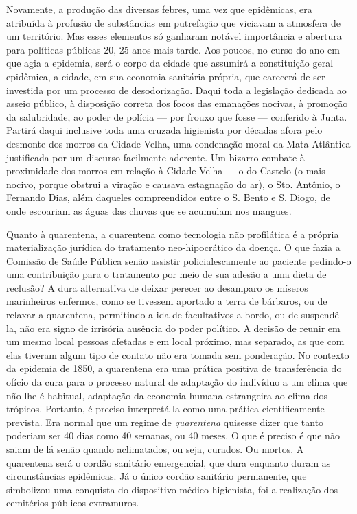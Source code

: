 Novamente, a produção das diversas febres, uma vez que epidêmicas, era
atribuída à profusão de substâncias em putrefação que viciavam a
atmosfera de um território. Mas esses elementos só ganharam notável
importância e abertura para políticas públicas 20, 25 anos mais tarde.
Aos poucos, no curso do ano em que agia a epidemia, será o corpo da
cidade que assumirá a constituição geral epidêmica, a cidade, em sua
economia sanitária própria, que carecerá de ser investida por um
processo de desodorização. Daqui toda a legislação dedicada ao asseio
público, à disposição correta dos focos das emanações nocivas, à
promoção da salubridade, ao poder de polícia --- por frouxo que fosse ---
conferido à Junta. Partirá daqui inclusive toda uma cruzada higienista
por décadas afora pelo desmonte dos morros da Cidade Velha, uma
condenação moral da Mata Atlântica justificada por um discurso
facilmente aderente. Um bizarro combate à proximidade dos morros em
relação à Cidade Velha --- o do Castelo (o mais nocivo, porque obstrui a
viração e causava estagnação do ar), o Sto. Antônio, o Fernando Dias,
além daqueles compreendidos entre o S. Bento e S. Diogo, de onde
escoariam as águas das chuvas que se acumulam nos mangues.

Quanto à quarentena, a quarentena como tecnologia não profilática é a
própria materialização jurídica do tratamento neo-hipocrático da doença.
O que fazia a Comissão de Saúde Pública senão assistir policialescamente
ao paciente pedindo-o uma contribuição para o tratamento por meio de sua
adesão a uma dieta de reclusão? A dura alternativa de deixar perecer ao
desamparo os míseros marinheiros enfermos, como se tivessem aportado a
terra de bárbaros, ou de relaxar a quarentena, permitindo a ida de
facultativos a bordo, ou de suspendê-la, não era signo de irrisória
ausência do poder político. A decisão de reunir em um mesmo local
pessoas afetadas e em local próximo, mas separado, as que com elas
tiveram algum tipo de contato não era tomada sem ponderação. No contexto
da epidemia de 1850, a quarentena era uma prática positiva de
transferência do ofício da cura para o processo natural de adaptação do
indivíduo a um clima que não lhe é habitual, adaptação da economia
humana estrangeira ao clima dos trópicos. Portanto, é preciso
interpretá-la como uma prática cientificamente prevista. Era normal que
um regime de \textit{quarentena} quisesse dizer que tanto poderiam ser 40
dias como 40 semanas, ou 40 meses. O que é preciso é que não saiam de lá
senão quando aclimatados, ou seja, curados. Ou mortos. A quarentena será
o cordão sanitário emergencial, que dura enquanto duram as
circunstâncias epidêmicas. Já o único cordão sanitário permanente, que
simbolizou uma conquista do dispositivo médico-higienista, foi a
realização dos cemitérios públicos extramuros.

